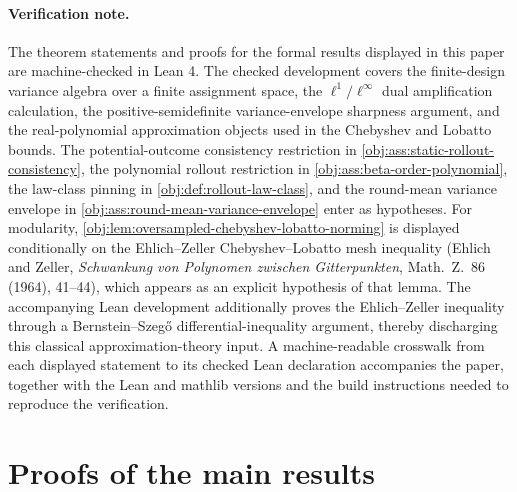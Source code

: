 \documentclass[11pt]{article}
\begin{document}
\paragraph{Verification note.}
The theorem statements and proofs for the formal results displayed in this paper are machine-checked in Lean 4. The checked development covers the finite-design variance algebra over a finite assignment space, the \(\ell^1/\ell^\infty\) dual amplification calculation, the positive-semidefinite variance-envelope sharpness argument, and the real-polynomial approximation objects used in the Chebyshev and Lobatto bounds. The potential-outcome consistency restriction in \cref{obj:ass:static-rollout-consistency}, the polynomial rollout restriction in \cref{obj:ass:beta-order-polynomial}, the law-class pinning in \cref{obj:def:rollout-law-class}, and the round-mean variance envelope in \cref{obj:ass:round-mean-variance-envelope} enter as hypotheses. For modularity, \cref{obj:lem:oversampled-chebyshev-lobatto-norming} is displayed conditionally on the Ehlich--Zeller Chebyshev--Lobatto mesh inequality (Ehlich and Zeller, \emph{Schwankung von Polynomen zwischen Gitterpunkten}, Math.\ Z.\ 86 (1964), 41--44), which appears as an explicit hypothesis of that lemma. The accompanying Lean development additionally proves the Ehlich--Zeller inequality through a Bernstein--Szeg\H{o} differential-inequality argument, thereby discharging this classical approximation-theory input. A machine-readable crosswalk from each displayed statement to its checked Lean declaration accompanies the paper, together with the Lean and mathlib versions and the build instructions needed to reproduce the verification.


\section{Proofs of the main results}\label{sec:deferred-proofs}
\end{document}

